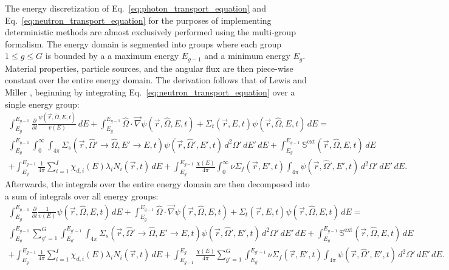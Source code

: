 The energy discretization of Eq.~\ref{eq:photon_transport_equation} and Eq.~\ref{eq:neutron_transport_equation} for the purposes of implementing deterministic methods are almost exclusively performed using the multi-group formalism. The energy domain is segmented into groups where each group $1 \leq g \leq G$ is bounded by a a maximum energy $E_{g - 1}$ and a minimum energy $E_{g}$. Material properties, particle sources, and the angular flux are then piece-wise constant over the entire energy domain. The derivation follows that of Lewis and Miller \cite{computational_methods}, beginning by integrating Eq.~\ref{eq:neutron_transport_equation} over a single energy group:
\begin{multline*}
    \int_{E_{g}}^{E_{g - 1}}\frac{\partial}{\partial t}\frac{\psi(\vec{r}, \hat{\Omega}, E, t)}{v(E)}\,dE 
    + \int_{E_{g}}^{E_{g - 1}}\hat{\Omega}\cdot\vec{\nabla}\psi(\vec{r}, \hat{\Omega}, E, t) + \Sigma_{t}(\vec{r}, E, t)\psi(\vec{r}, \hat{\Omega}, E, t)\,dE
    = 
    \\\int_{E_{g}}^{E_{g - 1}}\int_{0}^{\infty}\int_{4\pi} \Sigma_{s}(\vec{r}, \hat{\Omega}' \rightarrow \hat{\Omega}, E' \rightarrow E, t)\psi(\vec{r}, \hat{\Omega}', E', t)\, d^{2}\Omega'\,dE'\,dE 
    + \int_{E_{g}}^{E_{g - 1}}\mathbb{S}^{\text{ext}}(\vec{r}, \hat{\Omega}, E, t)\, dE
    \\+ \int_{E_{g}}^{E_{g - 1}}\frac{1}{4\pi}\sum_{i = 1}^{I} \chi_{d,i}(E)\lambda_{i}N_{i}(\vec{r}, t)\,dE
    + \int_{E_{g}}^{E_{g - 1}}\frac{\chi(E)}{4\pi}\int_{0}^{\infty} \nu\Sigma_{f}(\vec{r}, E', t)\int_{4\pi}\psi(\vec{r}, \hat{\Omega}', E', t)\, d^{2}\Omega'\, dE'\,dE 
    \text{.}
\end{multline*}
Afterwards, the integrals over the entire energy domain are then decomposed into a sum of integrals over all energy groups:
\begin{multline*}
    \int_{E_{g}}^{E_{g - 1}}\frac{\partial}{\partial t}\frac{1}{v(E)}\psi(\vec{r}, \hat{\Omega}, E, t)\,dE 
    + \int_{E_{g}}^{E_{g - 1}}\hat{\Omega}\cdot\vec{\nabla}\psi(\vec{r}, \hat{\Omega}, E, t) + \Sigma_{t}(\vec{r}, E, t)\psi(\vec{r}, \hat{\Omega}, E, t)\,dE
    = 
    \\\int_{E_{g}}^{E_{g - 1}}\sum_{g' = 1}^{G}\int_{E_{g'}}^{E_{g' - 1}}\int_{4\pi} \Sigma_{s}(\vec{r}, \hat{\Omega}' \rightarrow \hat{\Omega}, E' \rightarrow E, t)\psi(\vec{r}, \hat{\Omega}', E', t)\, d^{2}\Omega'\,dE'\,dE 
    + \int_{E_{g}}^{E_{g - 1}}\mathbb{S}^{\text{ext}}(\vec{r}, \hat{\Omega}, E, t)\, dE
    \\+ \int_{E_{g}}^{E_{g - 1}}\frac{1}{4\pi}\sum_{i = 1}^{I} \chi_{d,i}(E)\lambda_{i}N_{i}(\vec{r}, t)\,dE
    + \int_{E_{g - 1}}^{E_{g}}\frac{\chi(E)}{4\pi}\sum_{g' = 1}^{G}\int_{E_{g'}}^{E_{g' - 1}} \nu\Sigma_{f}(\vec{r}, E', t)\int_{4\pi}\psi(\vec{r}, \hat{\Omega}', E', t)\, d^{2}\Omega'\, dE'\,dE 
    \text{.}
\end{multline*}

